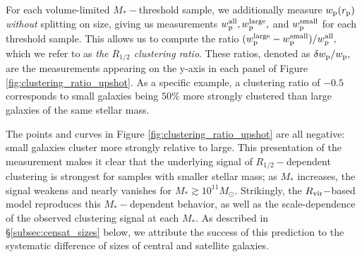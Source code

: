 \documentclass[usenatbib,usegraphicx,letterpaper]{mn2e}
\newcommand{\rhalf}{R_{1/2}}
\newcommand{\mstar}{M_{\ast}}
\newcommand{\rvir}{R_{\rm vir}}
\newcommand{\rproj}{r_{\rm p}}
\newcommand{\wproj}{w_{\rm p}}
\newcommand{\wplarge}{w_{\rm p}^{\rm large}}
\newcommand{\wpsmall}{w_{\rm p}^{\rm small}}
\newcommand{\wpall}{w_{\rm p}^{\rm all}}
\newcommand{\msun}{M_\odot}
\begin{document}
For each volume-limited $\mstar-$threshold sample, we additionally measure $\wproj(\rproj)$ {\em without} splitting on size, giving us measurements $\wpall, \wplarge,$ and $\wpsmall$ for each threshold sample. This allows us to compute the ratio $(\wplarge-\wpsmall)/\wpall,$ which we refer to as {\em the $\rhalf$ clustering ratio}. These ratios, denoted as $\delta\wproj/\wproj,$ are the measurements appearing on the y-axis in each panel of Figure \ref{fig:clustering_ratio_upshot}. As a specific example, a clustering ratio of $-0.5$ corresponds to small galaxies being $50\%$ more strongly clustered than large galaxies of the same stellar mass.

The points and curves in Figure \ref{fig:clustering_ratio_upshot} are all negative: small galaxies cluster more strongly relative to large. This presentation of the measurement makes it clear that the underlying signal of $\rhalf-$dependent clustering is strongest for samples with smaller stellar mass; as $\mstar$ increases, the signal weakens and nearly vanishes for $\mstar\gtrsim10^{11}\msun.$ Strikingly, the $\rvir-$based model reproduces this $\mstar-$dependent behavior, as well as the scale-dependence of the observed clustering signal at each $\mstar.$ As described in \S\ref{subsec:censat_sizes} below, we attribute the success of this prediction to the systematic difference of sizes of central and satellite galaxies.

\end{document}
